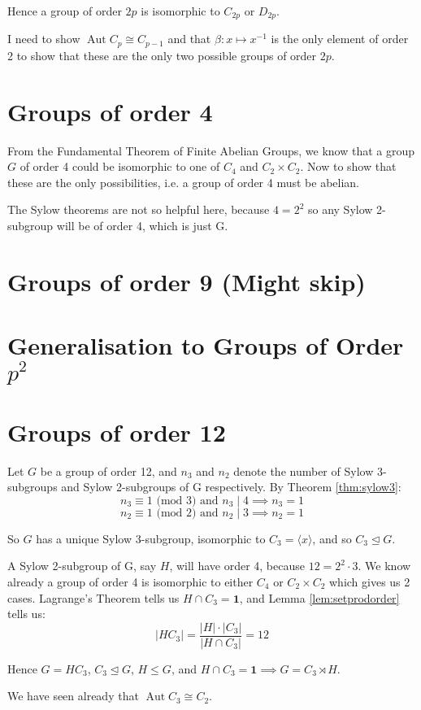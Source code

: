 \documentclass[a4paper, oneside, 12pt, draft]{article}
\theoremstyle{definition}
\DeclareMathOperator{\Aut}{Aut}
\begin{document}
Hence a group of order \(2p\) is isomorphic to \(C_{2p}\) or \(D_{2p}\).

I need to show \(\Aut{C_p} \cong C_{p-1}\) and that \(\beta:x \mapsto x^{-1}\)
is the only element of order 2 to show that these are the only two possible
groups of order \(2p\).

\section{Groups of order 4}
From the Fundamental Theorem of Finite Abelian Groups, we know that a group
\(G\) of order 4 could be isomorphic to one of \(C_4\) and \(C_2 \times C_2\).
Now to show that these are the only possibilities, i.e. a group of order 4 must
be abelian.

The Sylow theorems are not so helpful here, because \(4=2^2\) so any Sylow
2-subgroup will be of order 4, which is just G.

\section{Groups of order 9 (Might skip)}

\section{Generalisation to Groups of Order \(p^2\)}

\section{Groups of order 12}
Let \(G\) be a group of order 12, and \(n_3\) and \(n_2\) denote the number of
Sylow 3-subgroups and Sylow 2-subgroups of G respectively.
By Theorem \ref{thm:sylow3}:
\[n_3 \equiv 1 \text{ (mod 3) and } n_3 \mid 4 \implies n_3 = 1\]
\[n_2 \equiv 1 \text{ (mod 2) and } n_2 \mid 3 \implies n_2 = 1\]

So \(G\) has a unique Sylow 3-subgroup, isomorphic to \(C_3 = \langle x
\rangle\), and so \(C_3 \unlhd G\).

A Sylow 2-subgroup of G, say \(H\), will have order 4, because \(12 = 2^2 \cdot
3\).
We know already a group of order 4 is isomorphic to either \(C_4\) or \(C_2
\times C_2\) which gives us 2 cases.
Lagrange's Theorem tells us \(H \cap C_3 = \bm{1}\), and Lemma \ref{lem:setprodorder}
tells us:
\[|H C_3| = \frac{|H| \cdot |C_3|}{|H \cap C_3|} = 12\]

Hence \(G = H C_3\), \(C_3 \unlhd G\), \(H \leqslant G\), and \(H \cap C_3 =
\bm{1} \implies G = C_3 \rtimes H\).

We have seen already that \(\Aut{C_3} \cong C_2\).
\end{document}
